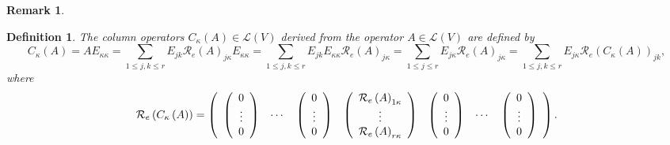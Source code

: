 \documentclass[aps,preprint]{revtex4}%
\newtheorem{definition}[theorem]{Definition}
\newtheorem{remark}[theorem]{Remark}
\begin{document}
\begin{remark}
\begin{enumerate}
\end{enumerate}
\end{remark}

\begin{definition}
The \emph{column operators} $C_{\kappa}\left(  A\right)  \in\mathcal{L}\left(
V\right)  $ derived from the operator $A\in\mathcal{L}\left(  V\right)  $ are
defined by
\begin{equation}
C_{\kappa}\left(  A\right)  =AE_{\kappa\kappa}=\sum_{1\leq j,k\leq r}%
E_{jk}\mathcal{R}_{e}\left(  A\right)  _{j\kappa}E_{\kappa\kappa}=\sum_{1\leq
j,k\leq r}E_{jk}E_{\kappa\kappa}\mathcal{R}_{e}\left(  A\right)  _{j\kappa
}=\sum_{1\leq j\leq r}E_{j\kappa}\mathcal{R}_{e}\left(  A\right)  _{j\kappa
}=\sum_{1\leq j,k\leq r}E_{j\kappa}\mathcal{R}_{e}\left(  C_{\kappa}\left(
A\right)  \right)  _{jk},
\end{equation}
where
\begin{equation}
\mathcal{R}_{e}\left(  C_{\kappa}\left(  A\right)  \right)  =\left(
\begin{array}
[c]{ccccccc}%
\left(
\begin{array}
[c]{c}%
0\\
\vdots\\
0
\end{array}
\right)  & \cdots & \left(
\begin{array}
[c]{c}%
0\\
\vdots\\
0
\end{array}
\right)  & \left(
\begin{array}
[c]{c}%
\mathcal{R}_{e}\left(  A\right)  _{1\kappa}\\
\vdots\\
\mathcal{R}_{e}\left(  A\right)  _{r\kappa}%
\end{array}
\right)  & \left(
\begin{array}
[c]{c}%
0\\
\vdots\\
0
\end{array}
\right)  & \cdots & \left(
\begin{array}
[c]{c}%
0\\
\vdots\\
0
\end{array}
\right)
\end{array}
\right)  .
\end{equation}

\end{definition}
\end{document}
